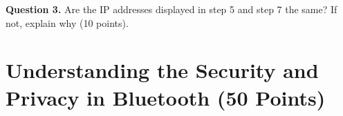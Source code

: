 \documentclass[11pt]{article}
\begin{document}
\begin{enumerate}
\begin{enumerate}
\textbf{Question 3.}  Are the IP addresses displayed in step 5 and step 7 the same? If not, explain why (10 points). 

\end{enumerate}







\section{Understanding the Security and Privacy in Bluetooth (50 Points)}




\end{enumerate}
\end{document}
